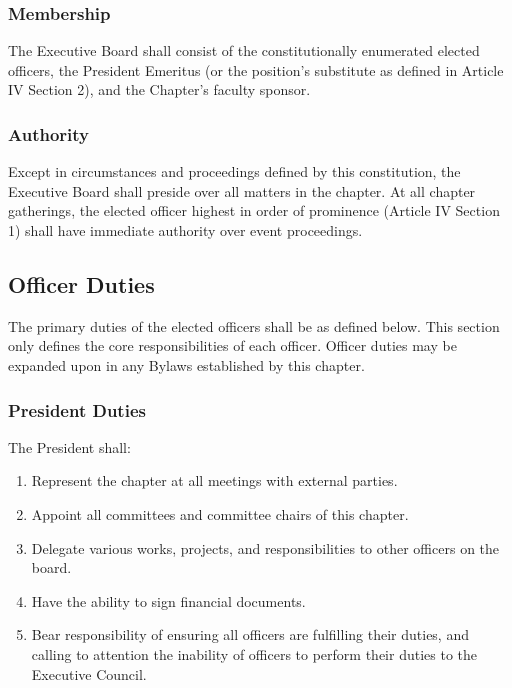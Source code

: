 \documentclass{article}
\begin{document}
\subsubsection{Membership}

The Executive Board shall consist of the constitutionally enumerated
elected officers, the President Emeritus (or the position's substitute
as defined in Article IV Section 2), and the Chapter's faculty sponsor.

\subsubsection{Authority}

Except in circumstances and proceedings defined by this constitution,
the Executive Board shall preside over all matters in the chapter. At
all chapter gatherings, the elected officer highest in order of
prominence (Article IV Section 1) shall have immediate authority over
event proceedings.

\subsection{Officer Duties}

The primary duties of the elected officers shall be as defined below.
This section only defines the core responsibilities of each officer.
Officer duties may be expanded upon in any Bylaws established by this
chapter.

\subsubsection{President Duties}

The President shall:

\begin{enumerate}
\item
  Represent the chapter at all meetings with external parties.
\item
  Appoint all committees and committee chairs of this chapter.
\item
  Delegate various works, projects, and responsibilities to other
  officers on the board.
\item
  Have the ability to sign financial documents.
\item
  Bear responsibility of ensuring all officers are fulfilling their
  duties, and calling to attention the inability of officers to perform
  their duties to the Executive Council.
\end{enumerate}
\end{document}
